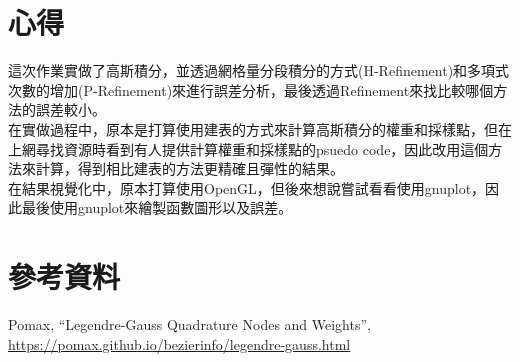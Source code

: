 \documentclass[a4paper,12pt]{article}
\begin{document}
\section{心得}
這次作業實做了高斯積分，並透過網格量分段積分的方式(H-Refinement)和多項式次數的增加(P-Refinement)來進行誤差分析，最後透過Refinement來找比較哪個方法的誤差較小。\\
在實做過程中，原本是打算使用建表的方式來計算高斯積分的權重和採樣點，但在上網尋找資源時看到有人提供計算權重和採樣點的psuedo code，因此改用這個方法來計算，得到相比建表的方法更精確且彈性的結果。\\
在結果視覺化中，原本打算使用OpenGL，但後來想說嘗試看看使用gnuplot，因此最後使用gnuplot來繪製函數圖形以及誤差。

\section{參考資料}

\begin{thebibliography}{1}

Pomax, “Legendre-Gauss Quadrature Nodes and Weights”, \url{https://pomax.github.io/bezierinfo/legendre-gauss.html}

\end{thebibliography}
\end{document}
